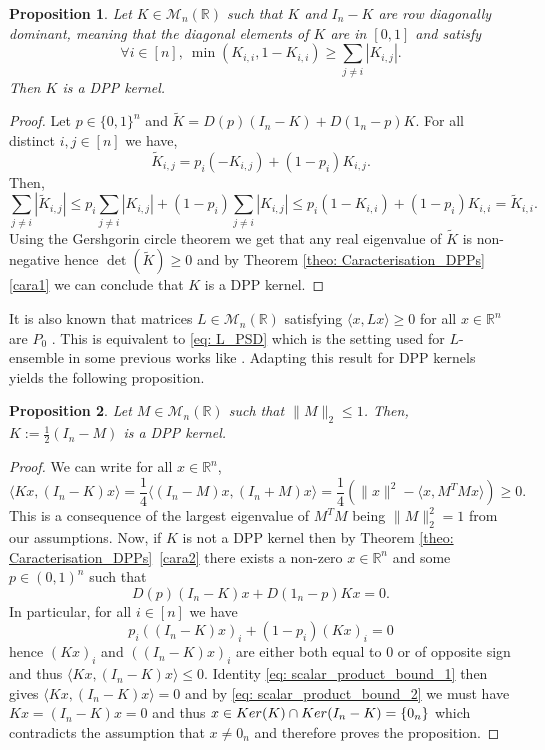 \documentclass{article}
\numberwithin{equation}{section}
\renewcommand{\leq}{\leqslant}
\renewcommand{\geq}{\geqslant}
\renewcommand{\tilde}{\widetilde}
\newcommand{\bR}{\mathbb{R}}
\newcommand{\cM}{\mathcal{M}}
\newcommand{\defeq}{:=}
\theoremstyle{plain}
\newtheorem{proposition}{Proposition}[section]
\begin{document}
\begin{proposition}
Let $K\in\mathcal{M}_n(\bR)$ such that $K$ and $I_n-K$ are row diagonally dominant, meaning that the diagonal elements of $K$ are in $[0,1]$ and satisfy
\[\forall i\in [n],~\min(K_{i,i}, 1-K_{i,i})\geq\sum_{j\neq i} |K_{i,j}|.\]
Then $K$ is a DPP kernel.
\end{proposition}
\begin{proof}
Let $p\in \{0,1\}^n$ and $\tilde K=D(p)(I_n-K)+D(1_n-p)K$.
For all distinct $i,j\in[n]$ we have, 
\[\tilde K_{i,j}=p_i(-K_{i,j})+(1-p_i)K_{i,j}.\] 
Then,
\[\sum_{j\neq i}|\tilde K_{i,j}|\leq p_i \sum_{j\neq i}|K_{i,j}|+(1-p_i)\sum_{j\neq i}|K_{i,j}|\leq p_i (1-K_{i,i})+(1-p_i)K_{i,i}=\tilde K_{i,i}.\]
Using the Gershgorin circle theorem we get that any real eigenvalue of $\tilde K$ is non-negative hence $\det(\tilde K)\geq 0$ and by Theorem \ref{theo: Caracterisation_DPPs} \ref{cara1} we can conclude that $K$ is a DPP kernel.
\end{proof}

\noindent It is also known that matrices $L\in\cM_n(\bR)$ satisfying $\langle x, Lx\rangle \geq 0$ for all $x\in\bR^n$ are $P_0$ \cite[Proposition 4.5.2]{Johnson20}. This is equivalent to \eqref{eq: L_PSD} which is the setting used for $L$-ensemble in some previous works like \cite{Gartrell21, Han}. Adapting this result for DPP kernels yields the following proposition.

\begin{proposition}\label{prop: perturb_half_identity}
Let $M\in\mathcal{M}_n(\bR)$ such that $\|M\|_2\leq 1$. Then, $K\defeq \frac{1}{2}(I_n-M)$ is a DPP kernel.
\end{proposition}
\begin{proof}
We can write for all $x\in\bR^n$,
\begin{equation}\label{eq: scalar_product_bound_1}
\langle Kx, (I_n-K)x\rangle = \frac{1}{4}\langle (I_n-M)x, (I_n+M)x\rangle
=\frac{1}{4}\left(\|x\|^2 - \langle x, M^TMx\rangle\right)\geq 0.
\end{equation}
This is a consequence of the largest eigenvalue of $M^TM$ being $\|M\|^2_2=1$ from our assumptions. Now, if $K$ is not a DPP kernel then by Theorem \ref{theo: Caracterisation_DPPs}~\ref{cara2} there exists a non-zero $x\in\bR^n$ and some $p\in (0, 1)^n$ such that
\[D(p)(I_n-K)x+D(1_n-p)Kx=0.\]
In particular, for all $i\in [n]$ we have
\begin{equation}\label{eq: scalar_product_bound_2}
p_i((I_n-K)x)_i+(1-p_i)(Kx)_i=0
\end{equation}
hence $(Kx)_i$ and $((I_n-K)x)_i$ are either both equal to $0$ or of opposite sign and thus $\langle Kx, (I_n-K)x\rangle \leq 0$. Identity \eqref{eq: scalar_product_bound_1} then gives $\langle Kx, (I_n-K)x\rangle = 0$ and by \eqref{eq: scalar_product_bound_2} we must have $Kx=(I_n-K)x=0$ and thus $x\in\textnormal{Ker}(K)\cap\textnormal{Ker}(I_n-K)=\{0_n\}$ which contradicts the assumption that $x\neq 0_n$ and therefore proves the proposition.
\end{proof}
\end{document}
